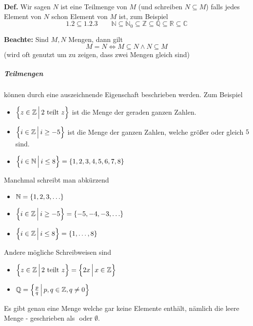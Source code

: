 \documentclass{scrreprt}
\begin{document}
\textbf{Def.} Wir sagen $N$ ist eine Teilmenge von $M$ (und schreiben
$N \subseteq M$) falls jedes Element von $N$ schon Element von $M$ ist,
zum Beispiel
\[
  \qty{1, 2} \subseteq \qty{1, 2, 3} \qquad
  \mathbb{N} \subseteq \mathbb{N}_0 \subseteq \mathbb{Z}
  \subseteq \mathbb{Q} \subseteq \mathbb{R} \subseteq \mathbb{C}
\]

\textbf{Beachte:} Sind $M, N$ Mengen, dann gilt
\[
  M = N \iff M \subseteq N \land N \subseteq M
\]
(wird oft genutzt um zu zeigen, dass zwei Mengen gleich sind)

\subparagraph{Teilmengen} können durch eine auszeichnende Eigenschaft beschrieben werden.
Zum Beispiel
\begin{itemize}
\item $\qty\Big{z \in \mathbb{Z} \, {\Big |} \, 2 \text{ teilt } z}$
  ist die Menge der geraden ganzen Zahlen.

\item $\qty\Big{i \in \mathbb{Z} \, {\Big |} \, i \geq -5}$
  ist die Menge der ganzen Zahlen, welche größer oder gleich $5$ sind.

\item $\qty\Big{i \in \mathbb{N} \, {\Big |} \, i \leq 8} =
  \qty{1, 2, 3, 4, 5, 6, 7, 8}$
\end{itemize}

Manchmal schreibt man abkürzend
\begin{itemize}
\item $\mathbb{N} = \qty{1, 2, 3, \ldots}$
\item $\qty\Big{i \in \mathbb{Z} \, {\Big |} \, i \geq -5} = \qty{-5, -4, -3, \ldots}$
\item $\qty\Big{i \in \mathbb{Z} \, {\Big |} \, i \leq 8} = \qty{1, \ldots, 8}$
\end{itemize}

Andere mögliche Schreibweisen sind
\begin{itemize}
\item $\qty\Big{z \in \mathbb{Z} \, {\Big |} \, 2 \text{ teilt } z} =
  \qty\Big{2x \, {\Big |} \, x \in \mathbb{Z}}$

\item $\mathbb{Q} =
  \qty{\frac{p}{q} \, \middle | \, p, q \in \mathbb{Z}, q \ne 0}$
\end{itemize}

Es gibt genau eine Menge welche gar keine Elemente enthält, nämlich die leere
Menge - geschrieben als $\qty{}$ oder $\emptyset$.
\\
\end{document}
